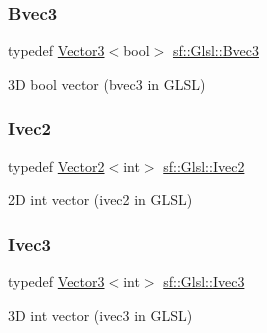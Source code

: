 \subsubsection{\texorpdfstring{Bvec3}{Bvec3}}
{\footnotesize\ttfamily typedef \mbox{\hyperlink{classsf_1_1_vector3}{Vector3}}$<$bool$>$ \mbox{\hyperlink{namespacesf_1_1_glsl_a4166ffc506619b4912d576e6eba2c957}{sf\+::\+Glsl\+::\+Bvec3}}}



3D bool vector ({\ttfamily bvec3} in G\+L\+SL) 

\begin{DoxyVerb}\end{DoxyVerb}
 \mbox{\label{namespacesf_1_1_glsl_aab803ee70c4b7bfcd63ec09e10408fd3}} 
\subsubsection{\texorpdfstring{Ivec2}{Ivec2}}
{\footnotesize\ttfamily typedef \mbox{\hyperlink{classsf_1_1_vector2}{Vector2}}$<$int$>$ \mbox{\hyperlink{namespacesf_1_1_glsl_aab803ee70c4b7bfcd63ec09e10408fd3}{sf\+::\+Glsl\+::\+Ivec2}}}



2D int vector ({\ttfamily ivec2} in G\+L\+SL) 

\begin{DoxyVerb}\end{DoxyVerb}
 \mbox{\label{namespacesf_1_1_glsl_a64f403dd0219e7f128ffddca641394df}} 
\subsubsection{\texorpdfstring{Ivec3}{Ivec3}}
{\footnotesize\ttfamily typedef \mbox{\hyperlink{classsf_1_1_vector3}{Vector3}}$<$int$>$ \mbox{\hyperlink{namespacesf_1_1_glsl_a64f403dd0219e7f128ffddca641394df}{sf\+::\+Glsl\+::\+Ivec3}}}



3D int vector ({\ttfamily ivec3} in G\+L\+SL) 

\begin{DoxyVerb}\end{DoxyVerb}
 \mbox{\label{namespacesf_1_1_glsl_adeed356d346d87634b4c197a530e4edf}} 
